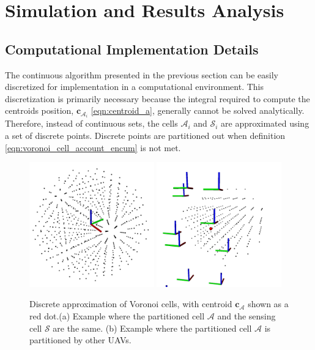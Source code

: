 \section{Simulation and Results Analysis}

    \subsection{Computational Implementation Details}
        The continuous algorithm presented in the previous section can be easily discretized for implementation in a computational environment.
        This discretization is primarily necessary because the integral required to compute the centroids position, $\mathbf{c}_{\mathcal{A}_i}$ \eqref{eqn:centroid_a}, generally cannot be solved analytically.
        Therefore, instead of continuous sets, the cells $\mathcal{A}_i$ and  $\mathcal{S}_i$ are approximated using a set of discrete points.
        Discrete points are partitioned out when definition \eqref{eqn:voronoi_cell_account_encum} is not met.
        \begin{figure}[htbp]
            \centering
            \includegraphics[width=0.48\textwidth, height=0.48\textwidth]{./fig/rviz/cs_equal_ca.png}
            \includegraphics[width=0.48\textwidth, height=0.48\textwidth]{./fig/rviz/ca_partitioned.png}
            \caption{
                Discrete approximation of Voronoi cells, with centroid $\mathbf{c}_{\mathcal{A}}$ shown as a red dot.(a) Example where the partitioned cell $\mathcal{A}$ and the sensing cell $\mathcal{S}$ are the same. (b) Example where the partitioned cell $\mathcal{A}$ is partitioned by other \ac{UAV}s.
            }
            \label{fig:rviz_cells}
        \end{figure}
        
